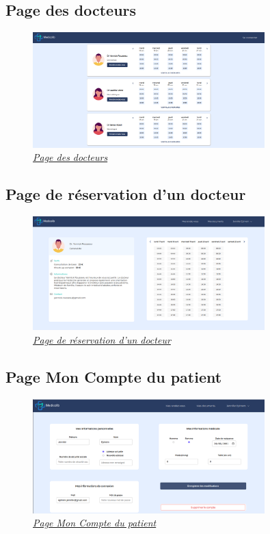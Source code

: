 \documentclass[a4paper]{report}
\begin{document}
\subsection{Page des docteurs}
\begin{figure}[H]
    \vspace{-10pt}
    \centering
    \includegraphics[width=0.8\textwidth]{captures/docteurs.png}
    \caption{\textit{\hyperref[docteurs]{Page des docteurs}}}
    \label{fig:DCU14}
\end{figure}

\subsection{Page de réservation d'un docteur}
\begin{figure}[H]
    \vspace{-10pt}
    \centering
    \includegraphics[width=0.8\textwidth]{captures/page-reservation-doctor.png}
    \caption{\textit{\hyperref[docteur]{Page de réservation d'un docteur}}}
    \label{fig:DCU15}
\end{figure}

\subsection{Page Mon Compte du patient}
\begin{figure}[H]
    \vspace{-10pt}
    \centering
    \includegraphics[width=0.8\textwidth]{captures/patient-edit-account.png}
    \caption{\textit{\hyperref[edit]{Page Mon Compte du patient}}}
    \label{fig:DCU16}
\end{figure}
\end{document}
